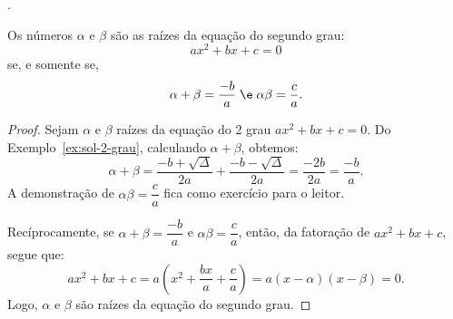 \begin{onlineact}
	.
\end{onlineact}

\begin{theorem}
	Os números $\alpha$ e $\beta$ são as raízes da equação do segundo grau:
	\[
		ax^2 + bx + c = 0
	\]
	se, e somente se,
	\[
		\alpha + \beta = \dfrac {-b} a \; \e \; \alpha \beta = \dfrac c a.
	\]
\end{theorem}

\begin{proof}
	Sejam $\alpha$ e $\beta$ raízes da equação do 2\tdeg{} grau $ax^2 + bx + c = 0$. Do Exemplo~\ref{ex:sol-2-grau}, calculando $\alpha+\beta$, obtemos:
	\[
		\alpha+\beta = \dfrac{-b+\sqrt\Delta}{2a}+\dfrac{-b-\sqrt\Delta}{2a} = \dfrac{-2b}{2a}=\dfrac{-b}{a}.
	\]
	A demonstração de $\alpha\beta = \dfrac c a$ fica como exercício para o leitor.

	Recíprocamente, se $\alpha+\beta = \dfrac {-b} a$ e $\alpha\beta = \dfrac c a$, então, da fatoração de $ax^2 + bx + c$, segue que:
	\[
		ax^2 + bx + c = a(x^2 + \frac {bx} a + \frac c a) = a(x - \alpha)(x - \beta) = 0.
	\]
	Logo, $\alpha$ e $\beta$ são raízes da equação do segundo grau.
\end{proof}